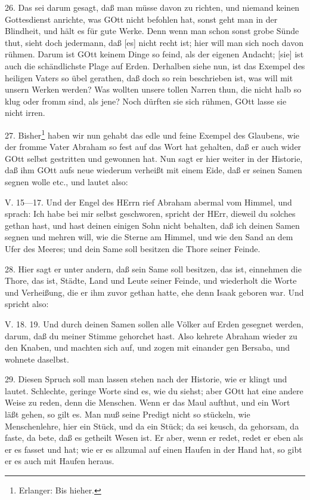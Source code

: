 26. Das sei darum gesagt, daß man müsse davon zu richten, und niemand keinen Gottesdienst anrichte, was GOtt nicht befohlen hat, sonst geht man in der Blindheit, und hält es für gute Werke. Denn wenn man schon sonst grobe Sünde thut, sieht doch jedermann, daß [es] nicht recht ist; hier will man sich noch davon rühmen. Darum ist GOtt keinem Dinge so feind, als der eigenen Andacht; [sie] ist auch die schändlichste Plage auf Erden. Derhalben siehe nun, ist das Exempel des heiligen Vaters so übel gerathen, daß doch so rein beschrieben ist, was will mit unsern Werken werden? Was wollten unsere tollen Narren thun, die nicht halb so klug oder fromm sind, als jene? Noch dürften sie sich rühmen, GOtt lasse sie nicht irren.

27. Bisher\footnote{Erlanger: Bis hieher.} haben wir nun gehabt das edle und feine Exempel des Glaubens, wie der fromme Vater Abraham so fest auf das Wort hat gehalten, daß er auch wider GOtt selbst gestritten und gewonnen hat. Nun sagt er hier weiter in der Historie, daß ihm GOtt aufs neue wiederum verheißt mit einem Eide, daß er seinen Samen segnen wolle etc., und lautet also:

\begin{schriftzitat}
V. 15—17. Und der Engel des HErrn rief Abraham abermal vom Himmel, und sprach: Ich habe bei mir selbst geschworen, spricht der HErr, dieweil du solches gethan hast, und hast deinen einigen Sohn nicht behalten, daß ich deinen Samen segnen und mehren will, wie die Sterne am Himmel, und wie den Sand an dem Ufer des Meeres; und dein Same soll besitzen die Thore seiner Feinde.
\end{schriftzitat}

28. Hier sagt er unter andern, daß sein Same soll besitzen, das ist, einnehmen die Thore, das ist, Städte, Land und Leute seiner Feinde, und wiederholt die Worte und Verheißung, die er ihm zuvor gethan hatte, ehe denn Isaak geboren war. Und spricht also:

\begin{schriftzitat}
V. 18. 19. Und durch deinen Samen sollen alle Völker auf Erden gesegnet werden, darum, daß du meiner Stimme gehorchet hast. Also kehrete Abraham wieder zu den Knaben, und machten sich auf, und zogen mit einander gen Bersaba, und wohnete daselbst.
\end{schriftzitat}

29. Diesen Spruch soll man lassen stehen nach der Historie, wie er klingt und lautet. Schlechte, geringe Worte sind es, wie du siehst; aber GOtt hat eine andere Weise zu reden, denn die Menschen. Wenn er das Maul aufthut, und ein Wort läßt gehen, so gilt es. Man muß seine Predigt nicht so stückeln, wie Menschenlehre, hier ein Stück, und da ein Stück; da sei keusch, da gehorsam, da faste, da bete, daß es getheilt Wesen ist. Er aber, wenn er redet, redet er eben als er es fasset und hat; wie er es allzumal auf einen Haufen in der Hand hat, so gibt er es auch mit Haufen heraus.

